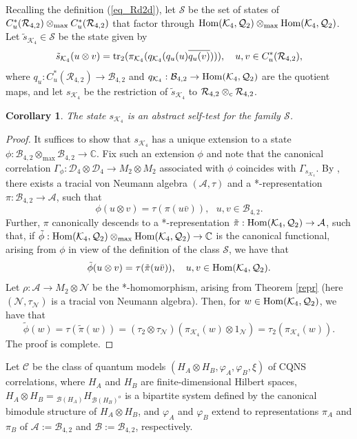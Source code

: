 \documentclass[11pt]{amsart}
\newtheorem{corollary}[theorem]{Corollary}
\theoremstyle{definition}
\newcommand{\cl}[1]{\mathcal{#1}}
\newcommand{\bb}[1]{\mathbb{#1}}
\begin{document}
Recalling the definition (\ref{eq_Rd2d}), 
let $\cl S$ be the set of states of 
$C^*_u(\cl R_{4,2})\otimes_{\rm max} C^*_u(\cl R_{4,2})$
that factor through ${\rm Hom}(\cl K_{4}, \cl Q_2)\otimes_{\rm max} {\rm Hom}(\cl K_{4}, \cl Q_2)$. 
Let $\tilde{s}_{\cl K_4}\in\cl S$ be the state given by 
$$\tilde{s}_{\cl K_4}(u\otimes v)
= {\rm tr}_2(\pi_{\cl K_4}(q_{\cl K_4}(q_u(u)\overline{q_u(v)}))), \ \ \ u,v\in C^*_u(\cl R_{4,2}),$$
where $q_u : C^*_u(\cl R_{4,2})\to \cl B_{4,2}$ and 
$q_{\cl K_4} : \cl B_{4,2}\to {\rm Hom}(\cl K_{4}, \cl Q_2)$
are the quotient maps, 
and let $s_{\cl K_4}$ be the restriction of 
$\tilde{s}_{\cl K_4}$ to $\cl R_{4,2}\otimes_{\rm c} \cl R_{4,2}$. 


\begin{corollary}\label{c:s_k}
    The state $s_{\cl K_4}$ is an abstract self-test for 
    the family $\cl S$. 
\end{corollary}


\begin{proof}
It suffices to show that $s_{\cl K_4}$ has a 
unique extension to a state 
$\phi : \cl B_{4,2}\otimes_{\max} \cl B_{4,2} \to \bb{C}$. Fix such an extension $\phi$ and note 
that the canonical correlation $\Gamma_{\phi} : \cl D_4\otimes \cl D_4\to M_2\otimes M_2$ associated with $\phi$
coincides with $\Gamma_{s_{\cl K_4}}$. 
By \cite[Theorem 3.2]{bhtt-JFA}, there exists a 
tracial von Neumann 
algebra $(\cl A,\tau)$ and a *-representation 
$\pi : \cl B_{4,2}\to \cl A$,  
such that 
$$\phi(u\otimes v) = \tau(\pi(u\bar{v})), \ \ \ 
u,v\in \cl B_{4,2}.$$
Further, $\pi$ canonically descends to a *-representation 
$\tilde{\pi} : {\rm Hom}(\cl K_{4}, \cl Q_2)\to \cl A$, 
such that, if 
$\tilde{\phi} : {\rm Hom}(\cl K_{4}, \cl Q_2)\otimes_{\max} {\rm Hom}(\cl K_{4}, \cl Q_2)\to \bb{C}$ is the 
canonical functional, arising from $\phi$ in view of the definition of the class $\cl S$, we have that 
$$\tilde{\phi}(u\otimes v) = \tau(\tilde{\pi}(u\bar{v})), \ \ \ 
u,v\in {\rm Hom}(\cl K_{4}, \cl Q_2).$$
Let $\rho : \cl A\to M_2\otimes \cl N$
be the *-homomorphism, arising from 
Theorem \ref{repr} (here $(\cl N,\tau_{\cl N})$
is a tracial von Neumann algebra). 
Then, for $w\in {\rm Hom}(\cl K_{4}, \cl Q_2)$, 
we have that 
$$\tilde{\phi}(w) = \tau(\tilde{\pi}(w)) = 
(\tau_2\otimes \tau_{\cl N})(\pi_{\cl K_4}(w)\otimes 1_{\cl N})
= \tau_2(\pi_{\cl K_4}(w)).$$
The proof is complete.
\end{proof}






Let $\cl C$ be the class of quantum  models 
$(H_A\otimes H_B, \varphi_A, \varphi_B,\xi)$ of CQNS correlations, where
$H_A$ and $H_B$ are finite-dimensional Hilbert spaces, 
$H_A\otimes H_B = \mbox{}_{\cl B(H_A)}H_{\cl B(H_B)^o}$ is a bipartite 
system defined by the canonical bimodule structure of $H_A\otimes H_B$, 
and $\varphi_A$ and $\varphi_B$ extend to representations $\pi_A$ and $\pi_B$ of $\cl A:=\cl B_{4,2}$ and $\cl B:=\cl B_{4,2}$, respectively. 
\end{document}
